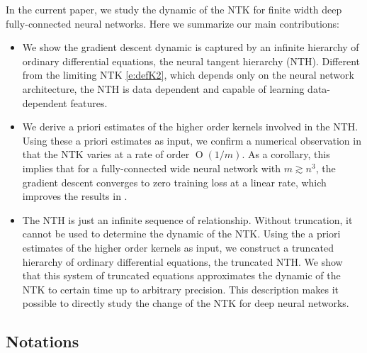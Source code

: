 \documentclass{article}
\numberwithin{equation}{section}
\DeclareMathOperator{\OO}{O}
\newcommand{\cob}{\color{darkblue}}
\newcommand{\nc}{\normalcolor}
\newcommand{\1}{\mathds{1}}
\theoremstyle{plain} %
\begin{document}
In the current paper, we study the dynamic of the NTK for finite width deep fully-connected neural networks.
Here we summarize our main contributions:
\begin{itemize}
\item We show the %
  gradient descent  dynamic 
is captured by an infinite hierarchy of ordinary differential equations, the neural tangent hierarchy (NTH).
Different from the limiting NTK \eqref{e:defK2}, which depends only on the neural network architecture, the NTH is data dependent and capable of learning data-dependent features.

\item
We derive  a priori %
 estimates of the higher order kernels involved in the NTH.  Using these a priori  estimates as input, we confirm a numerical observation in \cite{lee2019wide} that the NTK varies at a rate of order $\OO(1/m)$. As a corollary, this implies that for a fully-connected wide neural network with $m\gtrsim n^3$, the gradient descent converges to zero training loss at a linear rate,   which improves the results in \cite{du2018gradient2}.


\item
The NTH is just an infinite sequence of  relationship. Without truncation, it cannot be used to determine the dynamic of the NTK.
 Using the a priori estimates of the higher order kernels as input, we construct a  truncated hierarchy of ordinary differential equations, the truncated NTH. We show that  this system of truncated equations approximates the dynamic of the NTK to certain time up to arbitrary precision.  
This description makes it possible to directly study the change of the NTK for deep neural networks.


\end{itemize}





\subsection{Notations}
\end{document}

